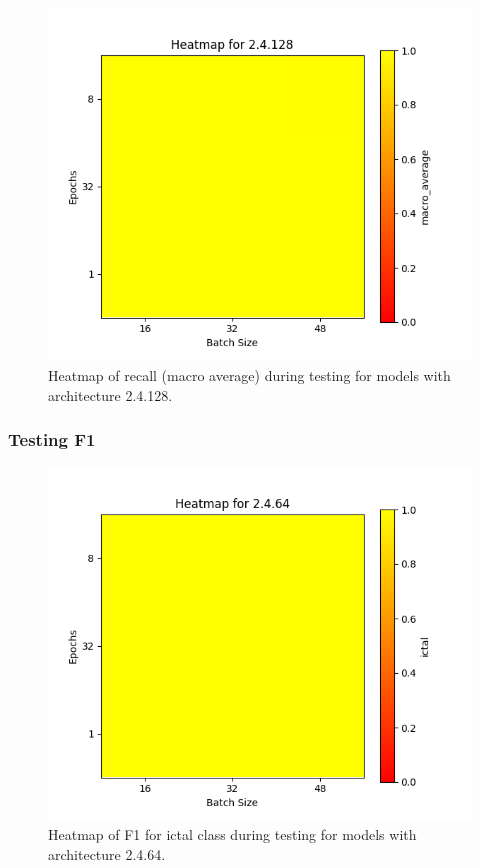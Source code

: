\documentclass[12pt]{article}
\begin{document}
\begin{figure}[H]
\includegraphics[width=\textwidth]{heatmap_recall_macro_average_2.4.128}
\centering
\caption{Heatmap of recall (macro average) during testing for models with architecture 2.4.128.}
\label{fig:time-metrics}
\end{figure}


\subsubsection{Testing F1}


\begin{figure}[H]
\includegraphics[width=\textwidth]{heatmap_f1_ictal_2.4.64}
\centering
\caption{Heatmap of F1 for ictal class during testing for models with architecture 2.4.64.}
\label{fig:time-metrics}
\end{figure}
\end{document}
